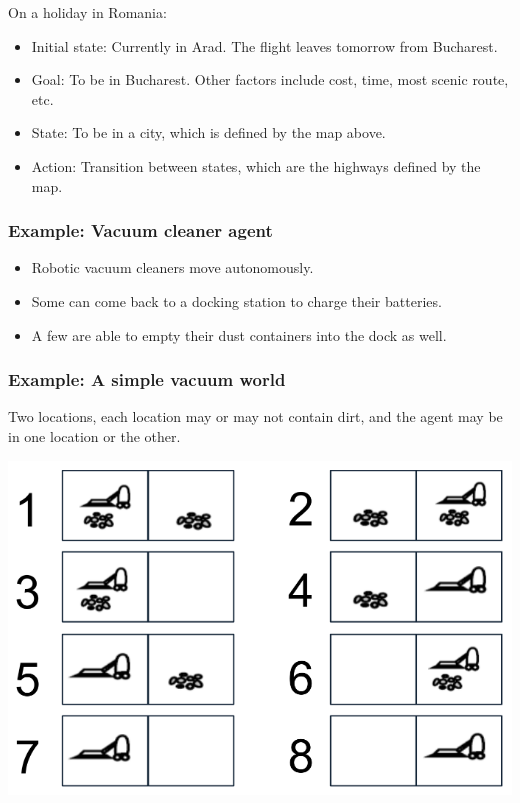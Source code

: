 \documentclass[11pt]{article}
\begin{document}
On a holiday in Romania:
\begin{itemize}
\item Initial state: Currently in Arad. The flight leaves tomorrow from Bucharest.
\item Goal: To be in Bucharest. Other factors include cost, time, most scenic route, etc.
\item State: To be in a city, which is defined by the map above.
\item Action: Transition between states, which are the highways defined by the map.
\end{itemize}
\subsubsection{Example: Vacuum cleaner agent}
\label{sec:orgcab10c4}
\begin{itemize}
\item Robotic vacuum cleaners move autonomously.
\item Some can come back to a docking station to charge their batteries.
\item A few are able to empty their dust containers into the dock as well.
\end{itemize}

 \newpage
\subsubsection{Example: A simple vacuum world}
\label{sec:orgfad5426}
Two locations, each location may or may not contain dirt, and the agent may be in one location or the other.

\begin{center}
\includegraphics[width=.9\linewidth]{./images/simple-vacuum-world-diagram.png}
\end{center}
\end{document}
